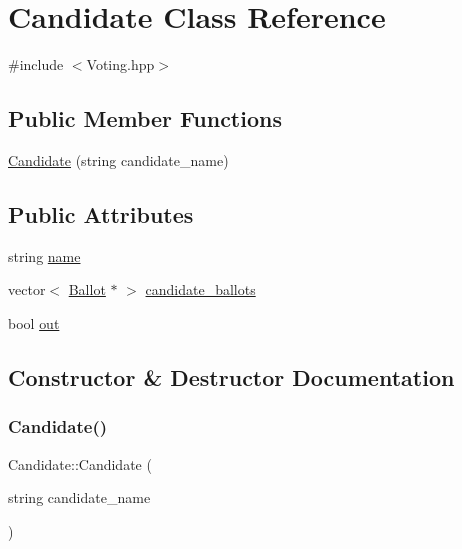 \hypertarget{classCandidate}{}\section{Candidate Class Reference}
\label{classCandidate}


{\ttfamily \#include $<$Voting.\+hpp$>$}

\subsection*{Public Member Functions}
\begin{DoxyCompactItemize}
\item 
\hyperlink{classCandidate_a3218052dbb4744b68f94c41f6158acf3}{Candidate} (string candidate\+\_\+name)
\end{DoxyCompactItemize}
\subsection*{Public Attributes}
\begin{DoxyCompactItemize}
\item 
string \hyperlink{classCandidate_a86d68d981f6e953aa40fddba7c84ccb1}{name}
\item 
vector$<$ \hyperlink{classBallot}{Ballot} $\ast$ $>$ \hyperlink{classCandidate_aa2a55fec163365b0430a7e6697b6b18e}{candidate\+\_\+ballots}
\item 
bool \hyperlink{classCandidate_aa155177c43079bd5601fb3ea6d4ca5c9}{out}
\end{DoxyCompactItemize}


\subsection{Constructor \& Destructor Documentation}
\mbox{\label{classCandidate_a3218052dbb4744b68f94c41f6158acf3}} 
\subsubsection{\texorpdfstring{Candidate()}{Candidate()}}
{\footnotesize\ttfamily Candidate\+::\+Candidate (\begin{DoxyParamCaption}\item[{string}]{candidate\+\_\+name }\end{DoxyParamCaption})\hspace{0.3cm}{\ttfamily [inline]}}



